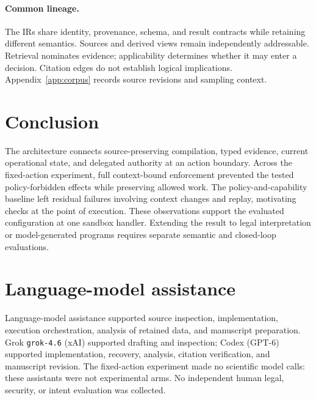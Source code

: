\documentclass{article}
\begin{document}
\paragraph{Common lineage.}
The IRs share identity, provenance, schema, and result contracts while retaining different semantics. Sources and derived views remain independently addressable. Retrieval nominates evidence; applicability determines whether it may enter a decision. Citation edges do not establish logical implications. Appendix~\ref{app:corpus} records source revisions and sampling context.








\section{Conclusion}

The architecture connects source-preserving compilation, typed evidence, current operational state, and delegated authority at an action boundary. Across the fixed-action experiment, full context-bound enforcement prevented the tested policy-forbidden effects while preserving allowed work. The policy-and-capability baseline left residual failures involving context changes and replay, motivating checks at the point of execution. These observations support the evaluated configuration at one sandbox handler. Extending the result to legal interpretation or model-generated programs requires separate semantic and closed-loop evaluations.\label{la-main-text-end}

\clearpage


\clearpage
\appendix


\section{Language-model assistance}
\label{app:disclosure}
Language-model assistance supported source inspection, implementation, execution orchestration, analysis of retained data, and manuscript preparation. Grok \texttt{grok-4.6} (xAI) supported drafting and inspection; Codex (GPT-6) supported implementation, recovery, analysis, citation verification, and manuscript revision. The fixed-action experiment made no scientific model calls: these assistants were not experimental arms. No independent human legal, security, or intent evaluation was collected.

\clearpage

\end{document}
